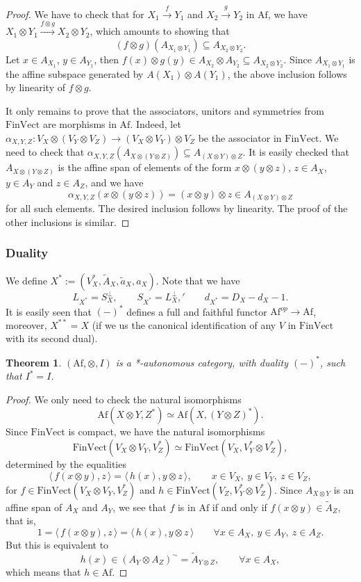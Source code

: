 \documentclass[12pt]{article}
\newtheorem{theorem}{Theorem}
\theoremstyle{definition}
\theoremstyle{remark}
\def\<{\langle\,}
\def\>{\,\rangle}
\def \Af{\mathrm{Af}}
\def \FV{\mathrm{FinVect}}
\begin{document}
\begin{proof}
We  have to check that for $X_1\xrightarrow{f} Y_1$ and $X_2\xrightarrow{g} Y_2$ in
$\Af$, we have $X_1\otimes Y_1\xrightarrow{f\otimes g} X_2\otimes Y_2$, which amounts to
showing that 
\[
(f\otimes g)(A_{X_1\otimes Y_1})\subseteq A_{X_2\otimes Y_2}.
\]
Let $x\in A_{X_1}$, $y\in A_{Y_1}$, then $f(x)\otimes g(y)\in A_{X_2}\otimes
A_{Y_2}\subseteq A_{X_2\otimes Y_2}$. Since  $A_{X_1\otimes Y_1}$ is the affine subspace
generated by $A(X_1)\otimes A(Y_1)$, the above inclusion follows by linearity of $f\otimes
g$. 

It only remains to prove that the associators, unitors and symmetries from
$\FV$ are morphisms in $\Af$. Indeed, let $\alpha_{X,Y,Z}:V_X\otimes (V_Y\otimes V_Z)\to
(V_X\otimes V_Y)\otimes V_Z$ be the associator in $\FV$. We need to check that
$\alpha_{X,Y,Z}(A_{X\otimes(Y\otimes Z)})\subseteq A_{(X\otimes Y)\otimes Z}$. It is easily
checked that $A_{X\otimes(Y\otimes Z)}$ is the affine span of elements of the form
$x\otimes (y\otimes z)$, $z\in A_X$, $y\in A_Y$ and $z\in A_Z$, and we have
\[
\alpha_{X,Y,Z}(x\otimes (y\otimes z))=(x\otimes y)\otimes z\in A_{(X\otimes Y)\otimes Z}
\]
for all such elements. The desired inclusion follows by linearity.
The proof of the other inclusions is similar.

\end{proof}



\subsubsection{Duality}

We define $X^*:=(V_X^*,\tilde A_X,\tilde a_X,a_X)$. Note that we have
\[
L_{X^*}=S_X^\perp,\qquad S_{X^*}=L_X^\perp,'\qquad d_{X^*}=D_X-d_X-1.
\]
It is easily seen  that $(-)^*$ defines a full and faithful functor $\Af^{op}\to \Af$,
moreover, $X^{**}=X$ (if we us the canonical identification of  any $V$ in $\FV$ with its second dual). 


\begin{theorem} $(\Af,\otimes,I)$ is a *-autonomous category, with duality $(-)^*$, such
that $I^*=I$.

\end{theorem}


\begin{proof} We only need to check the natural isomorphisms 
\[
\Af(X\otimes Y,Z^*)\simeq \Af(X,(Y\otimes Z)^*).
\]
Since $\FV$ is compact, we have the natural isomorphisms
\[
\FV(V_X\otimes V_Y,V^*_Z)\simeq \FV(V_X,V_Y^*\otimes V_Z^*),
\]
determined by the equalities
\[
\<f(x\otimes y),z\>=\<h(x),y\otimes z\>,\qquad x\in V_X,\ y\in V_Y,\ z\in V_Z,
\]
for $f\in \FV(V_X\otimes V_Y,V_Z^*)$ and $h\in \FV(V_Z,V_Y^*\otimes V_Z^*)$. Since
$A_{X\otimes Y}$ is an affine span of $A_X$ and $A_Y$, we see that
$f$ is in $\Af$ if and only if $f(x\otimes y)\in \tilde A_Z$, that is, 
\[
1=\<f(x\otimes y),z\>=\<h(x),y\otimes z\>\qquad \forall x\in A_X,\
y\in A_Y,\ z\in A_Z.
\]
But this is equivalent to
\[
h(x)\in (A_Y\otimes A_Z)^\sim=\tilde A_{Y\otimes Z},\qquad \forall x\in A_X,
\]
which means that $h\in \Af$.

\end{proof}
\end{document}
